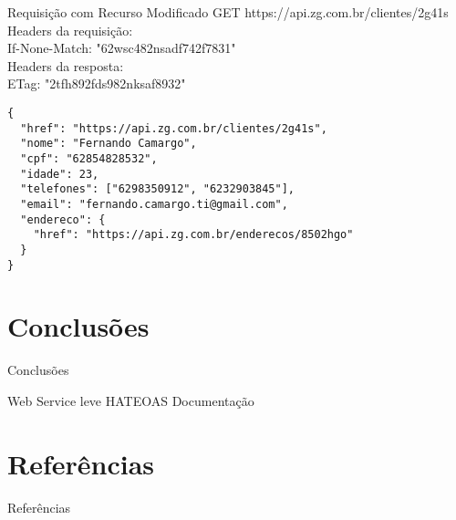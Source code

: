 \documentclass{beamer}
\begin{document}
\begin{frame}[fragile]{Requisição com Recurso Modificado}
  GET https://api.zg.com.br/clientes/2g41s\\
  Headers da requisição:\\
  \alert{If-None-Match}: "62wsc482nsadf742f7831"\\
  Headers da resposta:\\
  \alert{ETag}: "2tfh892fds982nksaf8932"
  \begin{verbatim}
{
  "href": "https://api.zg.com.br/clientes/2g41s",
  "nome": "Fernando Camargo",
  "cpf": "62854828532",
  "idade": 23,
  "telefones": ["6298350912", "6232903845"],
  "email": "fernando.camargo.ti@gmail.com",
  "endereco": {
    "href": "https://api.zg.com.br/enderecos/8502hgo"
  }
}
  \end{verbatim}
\end{frame}

\section{Conclusões}

\begin{frame}{Conclusões}
  \begin{outline}
     Web Service leve
     HATEOAS
     Documentação
  \end{outline}
\end{frame}


\section{Referências}

\begin{frame}[allowframebreaks]{Referências}
  \nocite{*} %
  
\end{frame}
\end{document}
